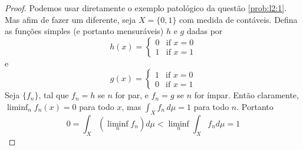\begin{problem}
    \label{prob:l2:2}
\end{problem}
\begin{proof}
    
    Podemos usar diretamente o exemplo patológico da questão \ref{prob:l2:1}. Mas afim de fazer um diferente, seja $X = \{0,1\}$ com medida de contáveis. Defina as funções simples (e portanto mensuráveis) $h$ e $g$ dadas por
    \begin{equation*}
    h(x)=
    \begin{cases}
        0 & \text{if } x =0\\
        1 & \text{if } x =1
    \end{cases}
\end{equation*}
e
\begin{equation*}
    g(x)=
    \begin{cases}
        1 & \text{if } x =0\\
        0 & \text{if } x =1
    \end{cases}
\end{equation*}
Seja $\{f_n\}$, tal que $f_n = h$ se $n$ for par, e $f_n = g$ se $n$ for ímpar. Então claramente,
$\liminf_n f_n(x) = 0$ para todo $x$, mas $\int_X f_n\, d\mu = 1$ para todo $n$. Portanto
$$0 = \int_X (\liminf_n f_n)d\mu < \liminf_n \int_X f_nd\mu = 1$$
\end{proof}

